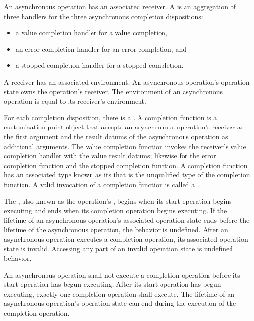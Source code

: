 \pnum
An asynchronous operation has an associated receiver.
A  is an aggregation of three handlers
for the three asynchronous completion dispositions:
\begin{itemize}
\item a value completion handler for a value completion,
\item an error completion handler for an error completion, and
\item a stopped completion handler for a stopped completion.
\end{itemize}
A receiver has an associated environment.
An asynchronous operation's operation state owns the operation's receiver.
The environment of an asynchronous operation
is equal to its receiver's environment.

\pnum
For each completion disposition, there is a .
A completion function is
a customization point object
that accepts an asynchronous operation's receiver as the first argument and
the result datums of the asynchronous operation as additional arguments.
The value completion function invokes
the receiver's value completion handler with the value result datums;
likewise for the error completion function and the stopped completion function.
A completion function has
an associated type known as its 
that is the unqualified type of the completion function.
A valid invocation of a completion function is called
a .

\pnum
The ,
also known as the operation's ,
begins when its start operation begins executing and
ends when its completion operation begins executing.
If the lifetime of an asynchronous operation's associated operation state
ends before the lifetime of the asynchronous operation,
the behavior is undefined.
After an asynchronous operation executes a completion operation,
its associated operation state is invalid.
Accessing any part of an invalid operation state is undefined behavior.

\pnum
An asynchronous operation shall not execute a completion operation
before its start operation has begun executing.
After its start operation has begun executing,
exactly one completion operation shall execute.
The lifetime of an asynchronous operation's operation state can end
during the execution of the completion operation.


